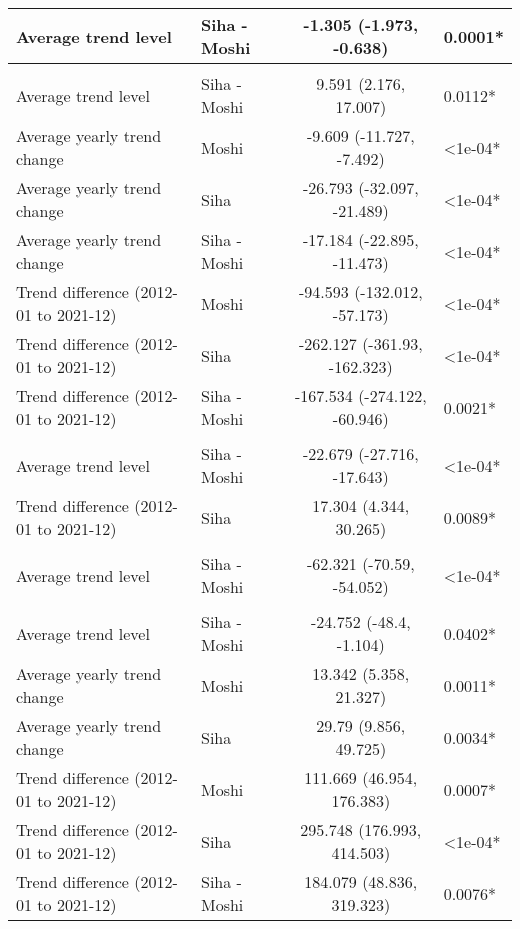 \begin{longtable}{l|lcl}
\midrule\addlinespace[2.5pt]
Average trend level & Siha - Moshi & -1.305 (-1.973, -0.638) & 0.0001* \\ 
\midrule\addlinespace[2.5pt]
\multicolumn{4}{l}{Malaria} \\[2.5pt] 
\midrule\addlinespace[2.5pt]
Average trend level & Siha - Moshi & 9.591 (2.176, 17.007) & 0.0112* \\ 
Average yearly trend change & Moshi & -9.609 (-11.727, -7.492) & <1e-04* \\ 
Average yearly trend change & Siha & -26.793 (-32.097, -21.489) & <1e-04* \\ 
Average yearly trend change & Siha - Moshi & -17.184 (-22.895, -11.473) & <1e-04* \\ 
Trend difference (2012-01 to 2021-12) & Moshi & -94.593 (-132.012, -57.173) & <1e-04* \\ 
Trend difference (2012-01 to 2021-12) & Siha & -262.127 (-361.93, -162.323) & <1e-04* \\ 
Trend difference (2012-01 to 2021-12) & Siha - Moshi & -167.534 (-274.122, -60.946) & 0.0021* \\ 
\midrule\addlinespace[2.5pt]
\multicolumn{4}{l}{Neuroses} \\[2.5pt] 
\midrule\addlinespace[2.5pt]
Average trend level & Siha - Moshi & -22.679 (-27.716, -17.643) & <1e-04* \\ 
Trend difference (2012-01 to 2021-12) & Siha & 17.304 (4.344, 30.265) & 0.0089* \\ 
\midrule\addlinespace[2.5pt]
\multicolumn{4}{l}{Other Cardiovascular Diseases} \\[2.5pt] 
\midrule\addlinespace[2.5pt]
Average trend level & Siha - Moshi & -62.321 (-70.59, -54.052) & <1e-04* \\ 
\midrule\addlinespace[2.5pt]
\multicolumn{4}{l}{Peptic Ulcers} \\[2.5pt] 
\midrule\addlinespace[2.5pt]
Average trend level & Siha - Moshi & -24.752 (-48.4, -1.104) & 0.0402* \\ 
Average yearly trend change & Moshi & 13.342 (5.358, 21.327) & 0.0011* \\ 
Average yearly trend change & Siha & 29.79 (9.856, 49.725) & 0.0034* \\ 
Trend difference (2012-01 to 2021-12) & Moshi & 111.669 (46.954, 176.383) & 0.0007* \\ 
Trend difference (2012-01 to 2021-12) & Siha & 295.748 (176.993, 414.503) & <1e-04* \\ 
Trend difference (2012-01 to 2021-12) & Siha - Moshi & 184.079 (48.836, 319.323) & 0.0076* \\ 

\end{longtable}
